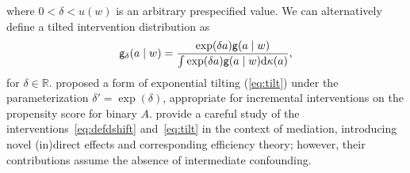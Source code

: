 where $0 < \delta < u(w)$ is an arbitrary prespecified value. We
can alternatively define a tilted intervention distribution as
\begin{equation}\label{eq:tilt}
  \mathsf{g}_\delta(a \mid w) = \frac{\exp(\delta a) \mathsf{g}(a \mid w)}
  {\int \exp(\delta a) \mathsf{g}(a\mid w)\mathrm{d}\kappa(a)},
\end{equation}
for $\delta \in \mathbb R$. %
\citet{kennedy2019nonparametric} proposed a form of exponential tilting
(\ref{eq:tilt}) under the parameterization $\delta' = \exp(\delta)$, appropriate
for incremental interventions on the propensity score for binary $A$.
\citet{diaz2020causal} provide a careful study of the
interventions~\ref{eq:defdshift} and~\ref{eq:tilt} in the context of mediation,
introducing novel (in)direct effects and corresponding efficiency theory;
however, their contributions assume the absence of intermediate confounding.


